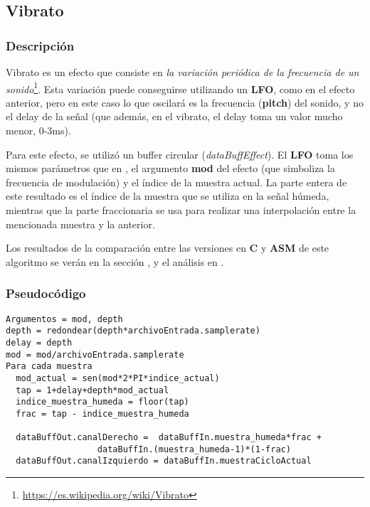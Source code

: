 \subsection{Vibrato}
\label{subsec:desarrollo-vibrato}

\subsubsection{Descripción}
\label{subsec:desarrollo-vibrato-desc}

Vibrato es un efecto que consiste en \textit{la variación periódica de la frecuencia de un sonido}\footnote{\url{https://es.wikipedia.org/wiki/Vibrato}}. Esta variación puede conseguirse utilizando un \textbf{LFO}, como en el efecto anterior, pero en este caso lo que oscilará es la frecuencia (\textbf{pitch}) del sonido, y no el delay de la señal (que además, en el vibrato, el delay toma un valor mucho menor, 0-3ms). 

Para este efecto, se utilizó un buffer circular (\textit{dataBuffEffect}). El \textbf{LFO} toma los mismos parámetros que en , el argumento \textbf{mod} del efecto (que simboliza la frecuencia de modulación) y el índice de la muestra actual. La parte entera de este resultado es el índice de la muestra que se utiliza en la señal húmeda, mientras que la parte fraccionaria se usa para realizar una interpolación entre la mencionada muestra y la anterior.


\vspace{\baselineskip}

Los resultados de la comparación entre las versiones en \textbf{C} y \textbf{ASM} de este algoritmo se verán en la sección , y el análisis en .

\subsubsection{Pseudocódigo}
\label{subsec:desarrollo-vibrato-code}

\lstset{language=C}
\begin{lstlisting}[frame=single]
Argumentos = mod, depth
depth = redondear(depth*archivoEntrada.samplerate)
delay = depth
mod = mod/archivoEntrada.samplerate
Para cada muestra
  mod_actual = sen(mod*2*PI*indice_actual)
  tap = 1+delay+depth*mod_actual
  indice_muestra_humeda = floor(tap)
  frac = tap - indice_muestra_humeda

  dataBuffOut.canalDerecho =  dataBuffIn.muestra_humeda*frac + 
			      dataBuffIn.(muestra_humeda-1)*(1-frac)
  dataBuffOut.canalIzquierdo = dataBuffIn.muestraCicloActual
\end{lstlisting}

